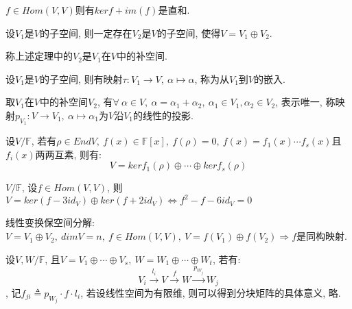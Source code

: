 \begin{example}
    $f\in Hom(V,V)$则有$kerf+im(f)$是直和.
\end{example}

\begin{theorem}
    设$V_1$是$V$的子空间, 则一定存在$V_2$是$V$的子空间, 使得$V=V_1\oplus V_2$.
\end{theorem}

\begin{definition}[补空间]
    称上述定理中的$V_2$是$V_1$在$V$中的补空间.
\end{definition}

\begin{definition}[嵌入]
    设$V_1$是$V$的子空间, 则有映射$\tau: V_1 \to V, \ \alpha \mapsto \alpha$, 称为从$V_1$到$V$的嵌入.
\end{definition}

\begin{definition}[线性投影]
    取$V_1$在$V$中的补空间$V_2$, 有$\forall \ \alpha \in V, \ \alpha=\alpha{_1}+\alpha{_2}, \ \alpha{_1}\in V_1, \alpha{_2}\in V_2$, 表示唯一, 称映射$p_{V_1}: V\to V_1, \ \alpha \mapsto \alpha{_1}$为$V$沿$V_1$的线性的投影.
\end{definition}

\begin{theorem}[准素分解定理]
    设$V/\mathbb{F}$, 若有$\rho \in EndV, \ f(x)\in\mathbb{F}[x], \ f(\rho)=0, \ f(x)=f_1(x)\cdots f_s(x)$且$f_i(x)$两两互素, 则有:
    \[V=kerf_1(\rho)\oplus\cdots\oplus kerf_s(\rho)\]
\end{theorem}

\begin{example}
    $V/\mathbb{F}$, 设$f\in Hom(V,V)$, 则$V=ker(f-3id_V)\oplus ker(f+2id_V)\Longleftrightarrow f^2-f-6id_V=0$
\end{example}

\begin{example}
    线性变换保空间分解: $V=V_1\oplus V_2, \ dimV=n, \ f\in Hom(V, V),\ V=f(V_1)\oplus f(V_2)\Longrightarrow f$是同构映射.
\end{example}

\begin{example}
    设$V,W/\mathbb{F}$, 且$V=V_1\oplus\cdots\oplus V_s, \ W=W_1\oplus\cdots\oplus W_t$, 若有:
    \[V_i\stackrel{l_i}{\to}V\stackrel{f}{\to}W\stackrel{p_{W_j}}{\to}W_j\],
    记$f_{ji}\triangleq p_{W_j}\cdot f \cdot l_i$, 若设线性空间为有限维, 则可以得到分块矩阵的具体意义, 略.
\end{example}
